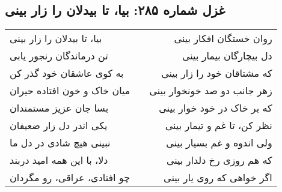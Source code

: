 \begin{center}
\section*{غزل شماره ۲۸۵: بیا، تا بیدلان را زار بینی}
\label{sec:285}
\begin{longtable}{l p{0.5cm} r}
بیا، تا بیدلان را زار بینی
&&
روان خستگان افکار بینی
\\
تن درماندگان رنجور یابی
&&
دل بیچارگان بیمار بینی
\\
به کوی عاشقان خود گذر کن
&&
که مشتاقان خود را زار بینی
\\
میان خاک و خون افتاده حیران
&&
زهر جانب دو صد خونخوار بینی
\\
بسا جان عزیز مستمندان
&&
که بر خاک در خود خوار بینی
\\
یکی اندر دل زار ضعیفان
&&
نظر کن، تا غم و تیمار بینی
\\
نبینی هیچ شادی در دل ما
&&
ولی اندوه و غم بسیار بینی
\\
دلا، با این همه امید دربند
&&
که هم روزی رخ دلدار بینی
\\
چو افتادی، عراقی، رو مگردان
&&
اگر خواهی که روی یار بینی
\\
\end{longtable}
\end{center}
